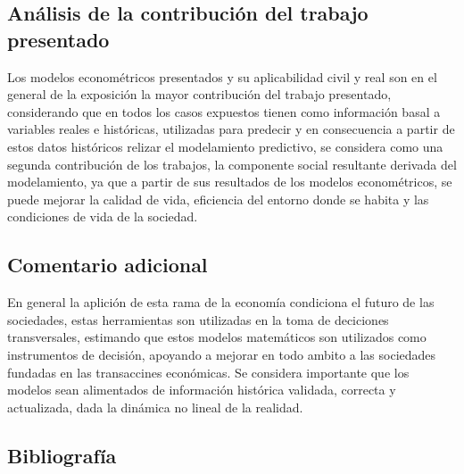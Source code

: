 \documentclass[
  american,
]{article}
\begin{document}
\hypertarget{anuxe1lisis-de-la-contribuciuxf3n-del-trabajo-presentado}{%
\subsection{Análisis de la contribución del trabajo
presentado}\label{anuxe1lisis-de-la-contribuciuxf3n-del-trabajo-presentado}}

Los modelos econométricos presentados y su aplicabilidad civil y real
son en el general de la exposición la mayor contribución del trabajo
presentado, considerando que en todos los casos expuestos tienen como
información basal a variables reales e históricas, utilizadas para
predecir y en consecuencia a partir de estos datos históricos relizar el
modelamiento predictivo, se considera como una segunda contribución de
los trabajos, la componente social resultante derivada del modelamiento,
ya que a partir de sus resultados de los modelos econométricos, se puede
mejorar la calidad de vida, eficiencia del entorno donde se habita y las
condiciones de vida de la sociedad.

\hypertarget{comentario-adicional}{%
\subsection{Comentario adicional}\label{comentario-adicional}}

En general la aplición de esta rama de la economía condiciona el futuro
de las sociedades, estas herramientas son utilizadas en la toma de
deciciones transversales, estimando que estos modelos matemáticos son
utilizados como instrumentos de decisión, apoyando a mejorar en todo
ambito a las sociedades fundadas en las transaccines económicas. Se
considera importante que los modelos sean alimentados de información
histórica validada, correcta y actualizada, dada la dinámica no lineal
de la realidad.

\hypertarget{bibliografuxeda}{%
\subsection{Bibliografía}\label{bibliografuxeda}}

\printbibliography
\end{document}
